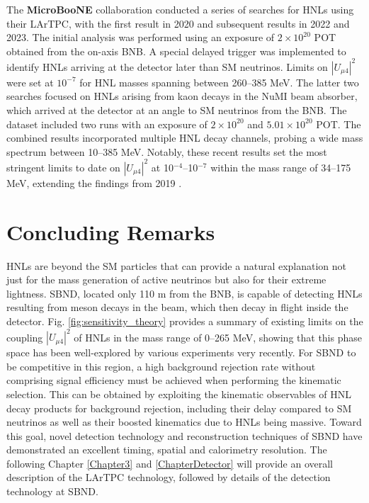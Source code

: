 \begin{coloritemize}
\item The \textbf{MicroBooNE} collaboration conducted a series of searches for HNLs using their LArTPC, with the first result in 2020 and subsequent results in 2022 and 2023.
The initial analysis was performed using an exposure of $2 \times 10^{20}$ POT obtained from the on-axis BNB.
A special delayed trigger was implemented to identify HNLs arriving at the detector later than SM neutrinos.
Limits on $|U_{\mu4}|^{2}$ were set at $10^{-7}$ for HNL masses spanning between 260--385 MeV.
The latter two searches focused on HNLs arising from kaon decays in the NuMI beam absorber, which arrived at the detector at an angle to SM neutrinos from the BNB.
The dataset included two runs with an exposure of $2 \times 10^{20}$ and $5.01 \times 10^{20}$ POT.
The combined results incorporated multiple HNL decay channels, probing a wide mass spectrum between 10--385 MeV.
Notably, these recent results set the most stringent limits to date on $|U_{\mu4}|^{2}$ at 10$^{-4}$--10$^{-7}$ within the mass range of 34--175 MeV, extending the findings from 2019 \cite{uboone1, uboone2, uboone3}.

\end{coloritemize}

\section{Concluding Remarks}
\label{sec2conclude}

HNLs are beyond the SM particles that can provide a natural explanation not just for the mass generation of active neutrinos but also for their extreme lightness.
SBND, located only 110 m from the BNB, is capable of detecting HNLs resulting from meson decays in the beam, which then decay in flight inside the detector.
Fig. \ref{fig:sensitivity_theory} provides a summary of existing limits on the coupling $|U_{\mu4}|^2$ of HNLs in the mass range of 0--265 MeV, showing that this phase space has been well-explored by various experiments very recently.
For SBND to be competitive in this region, a high background rejection rate without comprising signal efficiency must be achieved when performing the kinematic selection.
This can be obtained by exploiting the kinematic observables of HNL decay products for background rejection, including their delay compared to SM neutrinos as well as their boosted kinematics due to HNLs being massive. 
Toward this goal, novel detection technology and reconstruction techniques of SBND have demonstrated an excellent timing, spatial and calorimetry resolution. 
The following Chapter \ref{Chapter3} and \ref{ChapterDetector} will provide an overall description of the LArTPC technology, followed by details of the detection technology at SBND.
